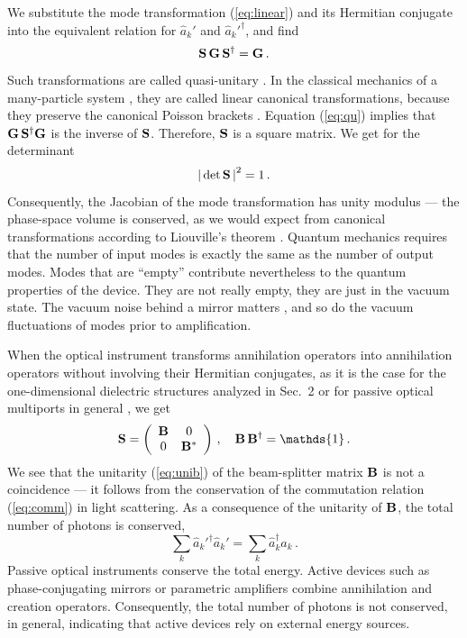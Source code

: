 \documentclass[12pt,amsmath,amssymb]{article}
\def\underline#1{{\bf #1}}
\numberwithin{equation}{section}
\begin{document}
We substitute the mode transformation (\ref{eq:linear}) and its Hermitian
conjugate into the equivalent relation for $\hat{a}_k'$ and
$\hat{a}_k'^\dagger$, and find
\begin{equation}
\label{eq:qu}
\underline{S}\,\underline{G}\,\underline{S}^\dagger = \underline{G}\,.
\end{equation}
Such transformations are called quasi-unitary \cite{Cornwell}. In the
classical mechanics of a many-particle system \cite{LL1}, they
are called linear canonical transformations, because they
preserve the canonical Poisson brackets \cite{LL1}. Equation
(\ref{eq:qu}) implies that $\underline{G}\,\underline{S}^\dagger
\underline{G}$ is the inverse of $\underline{S}$. Therefore,
$\underline{S}$ is a square matrix. We get for the determinant
\begin{equation}
\label{eq:jacobi} \left|\, \mathrm{det}\, \underline{S}
\,\right|^2 = 1 \,.
\end{equation}
Consequently, the Jacobian of the mode transformation has unity
modulus --- the phase-space volume is conserved, as we would
expect from canonical transformations according to Liouville's
theorem \cite{LL1}. Quantum mechanics requires that the number of
input modes is exactly the same as the number of output modes.
Modes that are ``empty'' contribute nevertheless to the quantum
properties of the device. They are not really empty, they are just in
the vacuum state. The vacuum noise behind a mirror matters
\cite{Leonhardt}, and so do the vacuum fluctuations of modes
prior to amplification.

When the optical instrument transforms annihilation operators into
annihilation operators without involving their Hermitian
conjugates, as it is the case for the one-dimensional dielectric
structures analyzed in Sec.\ 2 or for passive optical multiports in
general \cite{Mattle,Reck,Torma1,Torma3,Walker}, we get
\begin{equation}
\label{eq:unit} \underline{S} = \left(
    \begin{array}{cc}
      \underline{B} & 0 \\
       0 & {\underline{B}^*}
    \end{array}
\right) \,,\quad \underline{B}\,\underline{B}^\dagger =  \mathds{1}
\,.
\end{equation}
We see that the unitarity (\ref{eq:unib}) of the beam-splitter
matrix $\underline{B}$ is not a coincidence
--- it follows from the conservation of the commutation relation
(\ref{eq:comm}) in light scattering. As a consequence of the
unitarity of $\underline{B}$, the total number of photons is
conserved,
\begin{equation}
\label{eq:totalnumber}
\sum_k \hat{a}_k'^\dagger \hat{a}_k' =
\sum_k \hat{a}_k^\dagger \hat{a}_k
\,.
\end{equation}
Passive optical instruments conserve the total energy. Active
devices such as phase-conjugating mirrors \cite{Shen} or parametric
amplifiers \cite{Shen} combine annihilation and creation operators.
Consequently, the total number of photons is not conserved, in
general, indicating that active devices rely on external energy
sources.
\end{document}
